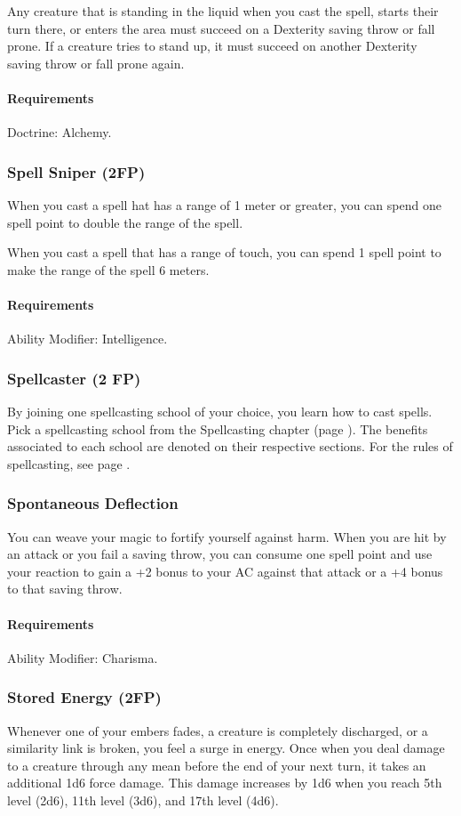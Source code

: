     Any creature that is standing in the liquid when you cast the spell, starts their turn there, or enters the area must succeed on a Dexterity saving throw or fall prone.
    If a creature tries to stand up, it must succeed on another Dexterity saving throw or fall prone again.
    \paragraph{Requirements} Doctrine: Alchemy.
\subsubsection{Spell Sniper (2FP)} \label{feat::spellsniper}
    When you cast a spell hat has a range of 1 meter or greater, you can spend one spell point to double the range of the spell.

    When you cast a spell that has a range of touch, you can spend 1 spell point to make the range of the spell 6 meters.
    \paragraph{Requirements} Ability Modifier: Intelligence.
\subsubsection{Spellcaster (2 FP)} \label{feat::spellcaster}
    By joining one spellcasting school of your choice, you learn how to cast spells.
    Pick a spellcasting school from the Spellcasting chapter (page \pageref{ch::spellcasting}).
    The benefits associated to each school are denoted on their respective sections.
    For the rules of spellcasting, see page \pageref{sec::spellcastingrules}.
\subsubsection{Spontaneous Deflection} \label{feat::spontaneousdeflection}
    You can weave your magic to fortify yourself against harm.
    When you are hit by an attack or you fail a saving throw, you can consume one spell point and use your reaction to gain a +2 bonus to your AC against that attack or a +4 bonus to that saving throw.
    \paragraph{Requirements} Ability Modifier: Charisma.
\subsubsection{Stored Energy (2FP)} \label{feat::storedenergy}
    Whenever one of your embers fades, a creature is completely discharged, or a similarity link is broken, you feel a surge in energy.
    Once when you deal damage to a creature through any mean before the end of your next turn, it takes an additional 1d6 force damage.
    This damage increases by 1d6 when you reach 5th level (2d6), 11th level (3d6), and 17th level (4d6).
